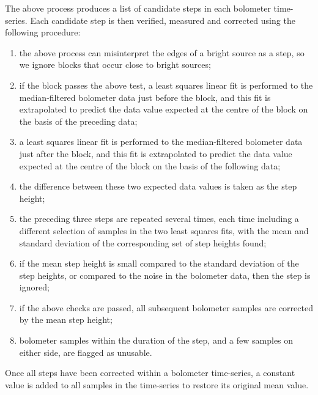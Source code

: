\documentclass[useAMS,usenatbib,nofootinbib]{mn2e}
\begin{document}
The above process produces a list of candidate steps in each bolometer
time-series. Each candidate step is then verified, measured and corrected
using the following procedure:

\begin{enumerate}

\item the above process can misinterpret the edges of a bright source
as a step, so we ignore blocks that occur close to bright sources;

\item if the block passes the above test, a least squares linear fit
is performed to the median-filtered bolometer data just before the
block, and this fit is extrapolated to predict the data value expected
at the centre of the block on the basis of the preceding data;

\item a least squares linear fit is performed to the median-filtered
bolometer data just after the block, and this fit is extrapolated to
predict the data value expected at the centre of the block on the
basis of the following data;

\item the difference between these two expected data values is taken
as the step height;

\item the preceding three steps are repeated several times, each time
including a different selection of samples in the two least squares
fits, with the mean and standard deviation of the corresponding set of
step heights found;

\item if the mean step height is small compared to the standard deviation
of the step heights, or compared to the noise in the bolometer data, then
the step is ignored;

\item if the above checks are passed, all subsequent bolometer samples
are corrected by the mean step height;

\item bolometer samples within the duration of the step, and a few
samples on either side, are flagged as unusable.

\end{enumerate}

Once all steps have been corrected within a bolometer time-series, a
constant value is added to all samples in the time-series to restore its
original mean value.
\end{document}
